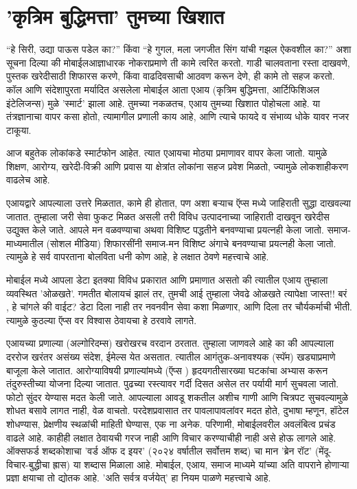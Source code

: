 \chapter{'कृत्रिम बुद्धिमत्ता' तुमच्या खिशात}

``हे सिरी, उद्या पाऊस पडेल का?'' किंवा ``हे गुगल, मला जगजीत सिंग यांची गझल ऐकवशील का?'' अशा सूचना दिल्या की मोबाईलआज्ञाधारक नोकराप्रमाणे ती कामे त्वरित करतो. गाडी चालवताना रस्ता दाखवणे, पुस्तक खरेदीसाठी शिफारस करणे, किंवा वाढदिवसाची आठवण करून देणे, ही कामे तो सहज करतो. कॉल आणि संदेशापुरता मर्यादित असलेला मोबाईल आता एआय (कृत्रिम बुद्धिमत्ता, आर्टिफिशिअल इंटेलिजन्स) मुळे 'स्मार्ट' झाला आहे. तुमच्या नकळतच, एआय तुमच्या खिशात पोहोचला आहे. या तंत्रज्ञानाचा वापर कसा होतो, त्यामागील प्रणाली काय आहे, आणि त्याचे फायदे व संभाव्य धोके यावर नजर टाकूया.

आज बहुतेक लोकांकडे स्मार्टफोन आहेत. त्यात एआयचा मोठ्या प्रमाणावर वापर केला जातो. यामुळे शिक्षण, आरोग्य, खरेदी-विक्री आणि प्रवास या क्षेत्रांत लोकांना सहज प्रवेश मिळतो, ज्यामुळे लोकशाहीकरण वाढलेच आहे.

एआयद्वारे आपल्याला उत्तरे मिळतात, कामे ही होतात, पण अशा बऱ्याच ऍप्स मध्ये जाहिराती सुद्धा दाखवल्या जातात. तुम्हाला जरी सेवा फुकट मिळत असली तरी विविध उत्पादनाच्या जाहिराती दाखवून खरेदीस उद्युक्त केले जाते. आपले मन वळवण्याचा अथवा विशिष्ट पद्धतीने बनवण्याचा प्रयत्नही केला जातो. समाज-माध्यमातील (सोशल मीडिया) शिफारसींनी समाज-मन विशिष्ट अंगाचे बनवण्याचा प्रयत्नही केला जातो. त्यामुळे हे सर्व वापरताना बोलविता धनी कोण आहे, हे लक्षात ठेवणे महत्त्वाचे आहे.

मोबाईल मध्ये आपला डेटा इतक्या विविध प्रकारात आणि प्रमाणात असतो की त्यातील एआय तुम्हाला व्यवस्थित 'ओळखते'. गमतीत बोलायचं झालं तर, तुमची आई तुम्हाला जेवढे ओळखते त्यापेक्षा जास्त!! बरं , हे चांगले की वाईट? डेटा दिला नाही तर नवनवीन सेवा कशा मिळणार, आणि दिला तर चौर्यकर्माची भीती. त्यामुळे कुठल्या ऍप्स वर विश्वास ठेवायचा हे ठरवावे लागते.

एआयच्या प्रणाल्या (अल्गोरिदम्स) खरोखरच वरदान ठरतात. तुम्हाला जाणवले आहे का की आपल्याला दररोज खरंतर असंख्य संदेश, ईमेल्स येत असतात. त्यातील आगंतुक-अनावश्यक (स्पॅम) खड्याप्रमाणे बाजूला केले जातात. आरोग्याविषयी प्रणाल्यांमध्ये (ऍप्स ) हृदयगतीसारख्या घटकांचा अभ्यास करून तंदुरुस्तीच्या योजना दिल्या जातात. पुढच्या रस्त्यावर गर्दी दिसत असेल तर पर्यायी मार्ग सुचवला जातो. फोटो सुंदर येण्यास मदत केली जाते. आपल्याला आवडू शकतील अशीच गाणी आणि चित्रपट सुचवल्यामुळे शोधत बसावे लागत नाही, वेळ वाचतो. परदेशप्रवासात तर पावलापावलांवर मदत होते, दुभाषा म्हणून, हॉटेल शोधण्यास, प्रेक्षणीय स्थळांची माहिती घेण्यास, एक ना अनेक. परिणामी, मोबाईलवरील अवलंबित्व प्रचंड वाढले आहे. काहीही लक्षात ठेवायची गरज नाही आणि विचार करण्याचीही नाही असे होऊ लागले आहे. ऑक्सफर्ड शब्दकोशाचा 'वर्ड ऑफ द इयर' (२०२४ वर्षातील सर्वोत्तम शब्द) चा मान 'ब्रेन रॉट' (मेंदू-विचार-बुद्धीचा ह्रास) या शब्दास मिळाला आहे. मोबाईल, एआय, समाज माध्यमे यांच्या अति वापराने होणाऱ्या प्रज्ञा क्षयाचा तो द्योतक आहे. 'अति सर्वत्र वर्जयेत्' हा नियम पाळणे महत्त्वाचे आहे.

